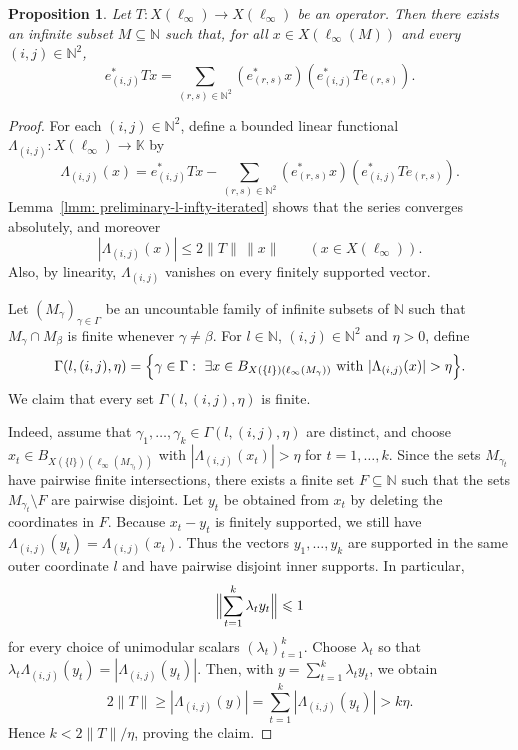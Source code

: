 \documentclass[11pt]{amsart}
\theoremstyle{plain}
\newtheorem{proposition}[theorem]{Proposition}
\theoremstyle{definition}
\numberwithin{equation}{section}
\newcommand{\norm}[1]{\lVert #1 \rVert}
\newcommand{\N}{\mathbb{N}}
\renewcommand{\le}{\leqslant}
\renewcommand{\ge}{\geqslant}
\begin{document}
\begin{proposition}\label{prop: l_inf-iterated-almost-basis-operators}
    Let $T \colon X(\ell_\infty) \to X(\ell_\infty)$ be an operator. Then there exists an infinite subset $M \subseteq \N$ such that, for all $x \in X(\ell_\infty(M))$ and every $(i,j) \in \N^2$,
    \begin{equation*}
        e^*_{(i,j)} T x = \sum_{(r,s) \in \N^2} (e^*_{(r,s)} x) (e^*_{(i,j)} T e_{(r,s)}).
    \end{equation*}
\end{proposition}
\begin{proof}
For each $(i,j)\in\N^2$, define a bounded linear functional
$\Lambda_{(i,j)}\colon X(\ell_\infty)\to\mathbb K$ by
\[
\Lambda_{(i,j)}(x)
= e^*_{(i,j)}Tx - \sum_{(r,s)\in\N^2}(e^*_{(r,s)}x)(e^*_{(i,j)}Te_{(r,s)}).
\]
Lemma~\ref{lmm: preliminary-l-infty-iterated} shows that the series converges absolutely, and moreover
\[
|\Lambda_{(i,j)}(x)|\le 2\norm{T}\,\norm{x}
\qquad(x\in X(\ell_\infty)).
\]
Also, by linearity, $\Lambda_{(i,j)}$ vanishes on every finitely supported vector.

Let $(M_\gamma)_{\gamma\in\Gamma}$ be an uncountable family of infinite subsets of $\N$ such that
$M_\gamma\cap M_\beta$ is finite whenever $\gamma\neq\beta$.
For $l\in\N$, $(i,j)\in\N^2$ and $\eta>0$, define
\[
\Gamma(l,(i,j),\eta)
=\Bigl\{\gamma\in\Gamma:\ \exists x\in B_{X(\{l\})(\ell_\infty(M_\gamma))}
\text{ with } |\Lambda_{(i,j)}(x)|>\eta\Bigr\}.
\]
We claim that every set $\Gamma(l,(i,j),\eta)$ is finite.

Indeed, assume that $\gamma_1,\dots,\gamma_k\in\Gamma(l,(i,j),\eta)$ are distinct, and choose
$x_t\in B_{X(\{l\})(\ell_\infty(M_{\gamma_t}))}$ with
$|\Lambda_{(i,j)}(x_t)|>\eta$ for $t=1,\dots,k$.
Since the sets $M_{\gamma_t}$ have pairwise finite intersections, there exists a finite set
$F\subseteq\N$ such that the sets $M_{\gamma_t}\setminus F$ are pairwise disjoint.
Let $y_t$ be obtained from $x_t$ by deleting the coordinates in $F$.
Because $x_t-y_t$ is finitely supported, we still have
$\Lambda_{(i,j)}(y_t)=\Lambda_{(i,j)}(x_t)$.
Thus the vectors $y_1,\dots,y_k$ are supported in the same outer coordinate $l$ and have pairwise disjoint inner supports.
In particular,
\[
\Bigl\|\sum_{t=1}^k \lambda_t y_t\Bigr\|\le 1
\]
for every choice of unimodular scalars $(\lambda_t)_{t=1}^k$.
Choose $\lambda_t$ so that
$\lambda_t\Lambda_{(i,j)}(y_t)=|\Lambda_{(i,j)}(y_t)|$.
Then, with $y=\sum_{t=1}^k \lambda_t y_t$, we obtain
\[
2\norm{T}
\ge |\Lambda_{(i,j)}(y)|
= \sum_{t=1}^k |\Lambda_{(i,j)}(y_t)|
> k\eta.
\]
Hence $k<2\norm{T}/\eta$, proving the claim.


\end{proof}
\end{document}
